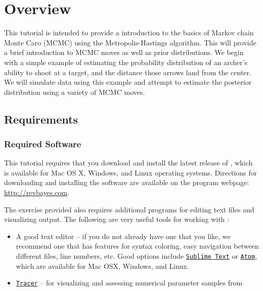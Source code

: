 
\section{Overview}\label{sect:Overview}

This tutorial is intended to provide a introduction to the basics of Markov chain Monte Caro (MCMC) using the  Metropolis-Hastings algorithm. This will provide a brief introduction to MCMC moves as well as prior distributions. We begin with a simple example of estimating the probability distribution of an archer's ability to shoot at a target, and the distance those arrows land from the center. We will simulate data using this example and attempt to estimate the posterior distribution using a variety of MCMC moves. 

\bigskip
\subsection{Requirements}\label{subsect:Overview-Requirements}

\subsubsection{Required Software}\label{subsub:Req-Software}
This tutorial requires that you download and install the latest release of \RevBayes \citep{Hoehna2017a}, which is available for Mac OS X, Windows, and Linux operating systems. 
Directions for downloading and installing the software are available on the program webpage:
\href{http://revbayes.com/}{http://revbayes.com}.

The exercise provided also requires additional programs for editing text files and visualizing output. 
The following are very useful tools for working with \RevBayes:
\begin{itemize}[noitemsep,topsep=0pt]
\item A good text editor -- if you do not already have one that you like, we recommend one that has features for syntax coloring, easy navigation between different files, line numbers, etc.
Good options include \href{http://www.sublimetext.com/}{\tt Sublime Text} or \href{https://atom.io/}{\tt Atom}, which are available for Mac OSX, Windows, and Linux.
\item \href{http://tree.bio.ed.ac.uk/software/tracer/}{\tt Tracer} -- for visualizing and assessing numerical parameter samples from \RevBayes
\end{itemize}


